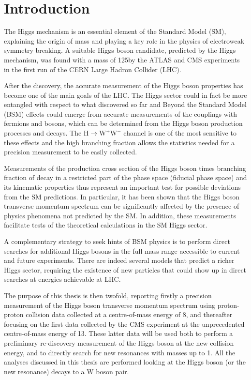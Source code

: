 \chapter*{Introduction}
\thispagestyle{empty}

The Higgs mechanism is an essential element of the Standard Model (SM), explaining the origin of mass and playing a key role in the physics of electroweak symmetry breaking. A suitable Higgs boson candidate, predicted by the Higgs mechanism, was found with a mass of 125\GeV by the ATLAS and CMS experiments in the first run of the CERN Large Hadron Collider (LHC).

After the discovery, the accurate measurement of the Higgs boson properties has become one of the main goals of the LHC. The Higgs sector could in fact be more entangled with respect to what discovered so far and Beyond the Standard Model (BSM) effects could emerge from accurate measurements of the couplings with fermions and bosons, which can be determined from the Higgs boson production processes and decays. The $\mathrm{H \to W^+W^-}$ channel is one of the most sensitive to these effects and the high branching fraction allows the statistics needed for a precision measurement to be easily collected.

Measurements of the production cross section of the Higgs boson times branching fraction of decay in a restricted part of the phase space (fiducial phase space) and its kinematic properties thus represent an important test for possible deviations from the SM predictions.
In particular, it has been shown that the Higgs boson transverse momentum spectrum can be significantly affected by the presence of physics phenomena not predicted by the SM. In addition, these measurements facilitate tests of the theoretical calculations in the SM Higgs sector.

A complementary strategy to seek hints of BSM physics is to perform direct searches for additional Higgs bosons in the full mass range accessible to current and future experiments. There are indeed several models that predict a richer Higgs sector, requiring the existence of new particles that could show up in direct searches at energies achievable at LHC.

The purpose of this thesis is then twofold, reporting firstly a precision measurement of the Higgs boson transverse momentum spectrum using proton-proton collision data collected at a centre-of-mass energy of 8\TeV, and thereafter focusing on the first data collected by the CMS experiment at the unprecedented centre-of-mass energy of 13\TeV. These latter data will be used both to perform a preliminary re-discovery measurement of the Higgs boson at the new collision energy, and to directly search for new resonances with masses up to 1\TeV. All the analyses discussed in this thesis are performed looking at the Higgs boson (or the new resonance) decays to a W boson pair.

